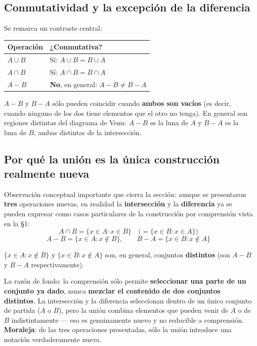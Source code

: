 \documentclass[12pt,a4paper]{article}
\begin{document}


\subsection{Conmutatividad y la excepción de la diferencia}

Se remarca un contraste central:

\begin{table}[H]
\centering
\begin{tabular}{@{}ll@{}}
\toprule
Operación & ¿Conmutativa? \\
\midrule
$A \cup B$ & Sí: $A \cup B = B \cup A$ \\
$A \cap B$ & Sí: $A \cap B = B \cap A$ \\
$A - B$ & \textbf{No}, en general: $A - B \ne B - A$ \\
\bottomrule
\end{tabular}
\end{table}

\begin{warnbox}
$A - B$ y $B - A$ sólo pueden coincidir cuando \textbf{ambos son vacíos} (es decir, cuando ninguno de los dos tiene elementos que el otro no tenga). En general son regiones distintas del diagrama de Venn: $A-B$ es la luna de $A$ y $B-A$ es la luna de $B$, ambas distintas de la intersección.
\end{warnbox}

\subsection{Por qué la unión es la única construcción realmente nueva}

Observación conceptual importante que cierra la sección: aunque se presentaron \textbf{tres} operaciones nuevas, en realidad la \textbf{intersección} y la \textbf{diferencia} ya se pueden expresar como casos particulares de la construcción por comprensión vista en la §1:
$$A \cap B = \{x \in A : x \in B\} \quad \big(= \{x \in B : x \in A\}\big)$$
$$A - B = \{x \in A : x \notin B\}, \qquad B - A = \{x \in B : x \notin A\}$$

\begin{warnbox}[Cuidado]
$\{x \in A : x \notin B\}$ y $\{x \in B : x \notin A\}$ son, en general, conjuntos \textbf{distintos} (son $A-B$ y $B-A$ respectivamente).
\end{warnbox}

La razón de fondo: la comprensión sólo permite \textbf{seleccionar una parte de un conjunto ya dado}, nunca \textbf{mezclar el contenido de dos conjuntos distintos}. La intersección y la diferencia seleccionan dentro de un único conjunto de partida ($A$ o $B$), pero la unión combina elementos que pueden venir de $A$ o de $B$ indistintamente — eso es genuinamente nuevo y no reducible a comprensión. \textbf{Moraleja}: de las tres operaciones presentadas, sólo la unión introduce una notación verdaderamente nueva.
\end{document}

